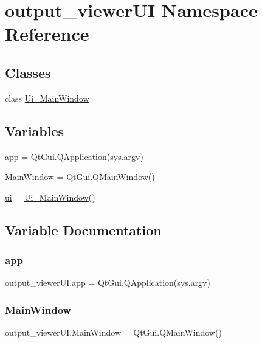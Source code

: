 \hypertarget{a00057}{}\section{output\+\_\+viewer\+UI Namespace Reference}
\label{a00057}
\subsection*{Classes}
\begin{DoxyCompactItemize}
\item 
class \hyperlink{a00098}{Ui\+\_\+\+Main\+Window}
\end{DoxyCompactItemize}
\subsection*{Variables}
\begin{DoxyCompactItemize}
\item 
\hyperlink{a00057_a2c3ab398f8123bd6d034a961fc6a4368}{app} = Qt\+Gui.\+Q\+Application(sys.\+argv)
\item 
\hyperlink{a00057_a95763e93bffcc3d9bda7ae977c5c2c4e}{Main\+Window} = Qt\+Gui.\+Q\+Main\+Window()
\item 
\hyperlink{a00057_a86154c987d338cba4f5269407ad97f69}{ui} = \hyperlink{a00098}{Ui\+\_\+\+Main\+Window}()
\end{DoxyCompactItemize}


\subsection{Variable Documentation}
\hypertarget{a00057_a2c3ab398f8123bd6d034a961fc6a4368}{}\label{a00057_a2c3ab398f8123bd6d034a961fc6a4368} 
\subsubsection{\texorpdfstring{app}{app}}
{\footnotesize\ttfamily output\+\_\+viewer\+U\+I.\+app = Qt\+Gui.\+Q\+Application(sys.\+argv)}

\hypertarget{a00057_a95763e93bffcc3d9bda7ae977c5c2c4e}{}\label{a00057_a95763e93bffcc3d9bda7ae977c5c2c4e} 
\subsubsection{\texorpdfstring{Main\+Window}{MainWindow}}
{\footnotesize\ttfamily output\+\_\+viewer\+U\+I.\+Main\+Window = Qt\+Gui.\+Q\+Main\+Window()}

